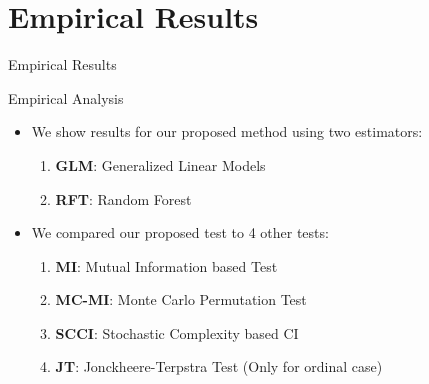\documentclass{beamer}
\def\ci{\perp\!\!\!\!\!\perp}
\begin{document}
\section{Empirical Results}
\begin{frame}
	\begin{center} \Huge{Empirical Results} \end{center}
\end{frame}
\begin{frame}{Empirical Analysis}
	\begin{itemize}
		\setlength\itemsep{1em}
		\item We show results for our proposed method using two estimators:
			\begin{enumerate}
				\item \textbf{GLM}: Generalized Linear Models
				\item \textbf{RFT}: Random Forest
			\end{enumerate}
		\item We compared our proposed test to 4 other tests:
			\begin{enumerate}
				\item \textbf{MI}: Mutual Information based Test
				\item \textbf{MC-MI}: Monte Carlo Permutation Test
				\item \textbf{SCCI}: Stochastic Complexity based CI \footnotemark
				\item \textbf{JT}: Jonckheere-Terpstra Test (Only for ordinal case)
			\end{enumerate}
	\end{itemize}
\end{frame}
\end{document}

